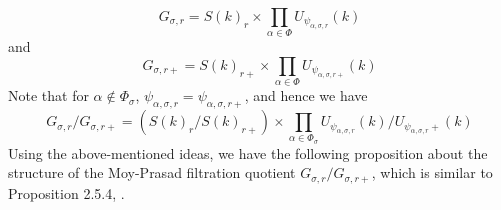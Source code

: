 \documentclass[11 pt]{article}
\numberwithin{equation}{subsection}
\theoremstyle{definition}
\theoremstyle{remark}
\theoremstyle{conjecture}
\begin{document}
\begin{equation*}
    G_{\sigma,r}= S(k)_r \times \prod_{\alpha \in \Phi} U_{\psi_{\alpha,\sigma,r}}(k)  
\end{equation*}
and 
\begin{equation*}
    G_{\sigma,r+}= S(k)_{r+} \times \prod_{\alpha \in \Phi }U _{\psi_{\alpha,\sigma,r+}}(k) 
\end{equation*}
Note that for $\alpha \not\in \Phi_\sigma $, $\psi_{\alpha,\sigma,r}=\psi_{\alpha,\sigma,r+}$, and hence we have 
\begin{equation}\label{quotientstructure}
    G_{\sigma,r}/G_{\sigma,r+}= \left(S(k)_r/S(k)_{r+}\right) \times \prod_{\alpha \in \Phi_\sigma } U _{\psi_{\alpha,\sigma,r}}(k)/U _{\psi_{\alpha,\sigma,r}+}(k)
\end{equation}
Using the above-mentioned ideas, we have the following proposition about the structure of the Moy-Prasad filtration quotient $G_{\sigma,r}/G_{\sigma,r+}$, which is similar to Proposition 2.5.4, \cite{moysavin}.
\end{document}
